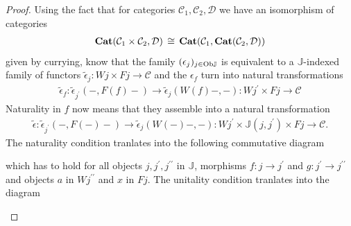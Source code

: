 \documentclass[12pt,oneside,reqno,a4paper]{article}
\theoremstyle{definition}
\newcommand{\Ob}{\textup{Ob}}
\newcommand{\Cat}{\textbf{\textup{Cat}}}
\renewcommand{\tilde}[1]{\widetilde{#1}}
\newcommand{\iso}{\,\cong\,}
\newcommand{\id}{\textup{id}}
\newcommand{\C}{\mathcal{C}}
\newcommand{\D}{\mathcal{D}}
\newcommand{\bJ}{\mathbb{J}}
\newcommand{\p}{^\prime}
\newcommand{\pp}{^{\prime\prime}}
\begin{document}
\begin{proof}
Using the fact that for categories $\C_1,\C_2,\D$ we have an isomorphism of categories
\begin{align*}
\Cat(\C_1\times\C_2,\D)\iso\Cat(\C_1,\Cat(\C_2,\D))
\end{align*} 
given by currying, know that the family $(\epsilon_j)_{j\in\Ob\bJ}$ is equivalent to a $\bJ$-indexed family of functors $\tilde{\epsilon}_j:Wj\times Fj\to \C$ and the $\epsilon_f$ turn into natural transformations 
\begin{align*}
\tilde{\epsilon}_f:\tilde{\epsilon}_{j\p}(-,F(f)-)\to \tilde{\epsilon}_j(W(f)-,-):Wj\p\times Fj\to\C
\end{align*}
Naturality in $f$ now means that they assemble into a natural transformation
\begin{align*}
\tilde{\epsilon}:\tilde{\epsilon}_{j\p}(-,F(-)-)\to \tilde{\epsilon}_j(W(-)-,-):Wj\p\times \bJ(j,j\p)\times Fj\to\C.
\end{align*}
The naturality condition tranlates into the following commutative diagram
\begin{center}
\end{center}
which has to hold for all objects $j,j\p,j\pp$ in $\bJ$, morphisms $f:j\to j\p$ and $g:j\p\to j\pp$ and objects $a$ in $Wj\pp$ and $x$ in $Fj$. The unitality condition tranlates into the diagram
\begin{center}

\end{center}
\end{proof}
\end{document}
